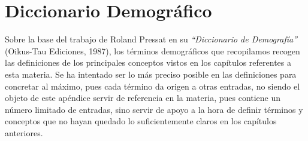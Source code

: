 
\chapter{Diccionario Demogr\'afico} %

\label{AppendixA} %

Sobre la base del trabajo de Roland Pressat en su \textit{``Diccionario de Demografía''} (Oikus-Tau Ediciones, 1987), los términos demográficos que recopilamos recogen las definiciones de los principales conceptos vistos en los cap\'itulos referentes a esta materia. Se ha intentado ser lo m\'as preciso posible en las definiciones para concretar al m\'aximo, pues cada t\'ermino da origen a otras entradas, no siendo el objeto de este ap\'endice servir de referencia en la materia, pues contiene un n\'umero limitado de entradas, sino servir de apoyo a la hora de definir términos y conceptos que no hayan quedado lo suficientemente claros en los capítulos anteriores.

